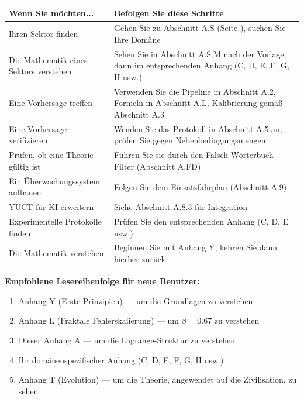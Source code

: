 \documentclass[13pt,a4paper]{article}
\begin{document}
	\begin{tabularx}{\textwidth}{|p{3.5cm}|X|}
		\hline
		\textbf{Wenn Sie möchten...} & \textbf{Befolgen Sie diese Schritte} \\
		\hline
		Ihren Sektor finden & Gehen Sie zu Abschnitt A.S (Seite \pageref{sec:sector-catalog}), suchen Sie Ihre Domäne \\
		\hline
		Die Mathematik eines Sektors verstehen & Sehen Sie in Abschnitt A.S.M nach der Vorlage, dann im entsprechenden Anhang (C, D, E, F, G, H usw.) \\
		\hline
		Eine Vorhersage treffen & Verwenden Sie die Pipeline in Abschnitt A.2, Formeln in Abschnitt A.L, Kalibrierung gemäß Abschnitt A.3 \\
		\hline
		Eine Vorhersage verifizieren & Wenden Sie das Protokoll in Abschnitt A.5 an, prüfen Sie gegen Nebenbedingungsmengen \\
		\hline
		Prüfen, ob eine Theorie gültig ist & Führen Sie sie durch den Falsch-Wörterbuch-Filter (Abschnitt A.FD) \\
		\hline
		Ein Überwachungssystem aufbauen & Folgen Sie dem Einsatzfahrplan (Abschnitt A.9) \\
		\hline
		YUCT für KI erweitern & Siehe Abschnitt A.8.3 für Integration \\
		\hline
		Experimentelle Protokolle finden & Prüfen Sie den entsprechenden Anhang (C, D, E usw.) \\
		\hline
		Die Mathematik verstehen & Beginnen Sie mit Anhang Y, kehren Sie dann hierher zurück \\
		\hline
	\end{tabularx}
	
	\vspace{0.5cm}
	\noindent\textbf{Empfohlene Lesereihenfolge für neue Benutzer:}
	\begin{enumerate}
		\item Anhang Y (Erste Prinzipien) — um die Grundlagen zu verstehen
		\item Anhang L (Fraktale Fehlerskalierung) — um \(\beta = 0.67\) zu verstehen
		\item Dieser Anhang A — um die Lagrange-Struktur zu verstehen
		\item Ihr domänenspezifischer Anhang (C, D, E, F, G, H usw.)
		\item Anhang T (Evolution) — um die Theorie, angewendet auf die Zivilisation, zu sehen
	\end{enumerate}
	
	
	\tableofcontents
	\newpage
	
\end{document}
